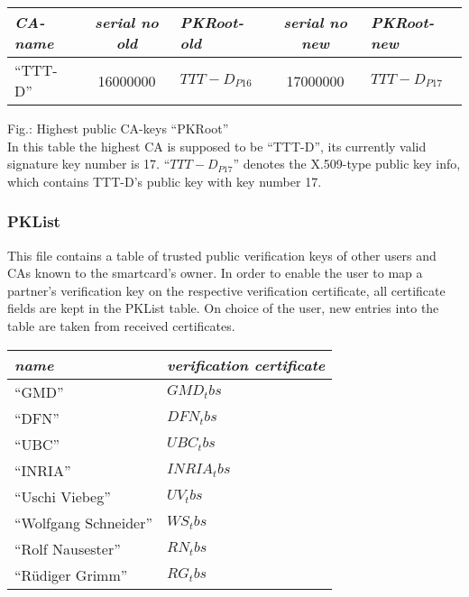 \begin {center}
\begin {tabular}{|l|c|l|c|l|}
\hline
{\em CA-name} &
{\em serial no old} & {\em PKRoot-old} &
{\em serial no new} & {\em PKRoot-new} \\
\hline
``TTT-D'' &
16000000 & $TTT-D_{P16}$ &
17000000 & $TTT-D_{P17}$ \\ \hline
\end {tabular}
\end {center}
 
\label{fig-pkroot}
{\footnotesize Fig.: Highest public CA-keys ``PKRoot''}
\\
{\footnotesize
In this table the highest CA is supposed to be
``TTT-D'', its currently valid signature key number is 17.
``$TTT-D_{P17}$'' denotes the X.509-type public key info,
which contains TTT-D's public key with key number 17.}

\subsubsection{PKList}
\label{pklist}

This file contains a table of trusted public verification keys of other
users and CAs known to the smartcard's owner.
In order to enable the user to map a partner's verification key
on the respective verification certificate,
all certificate fields are kept in the PKList table.
On choice of the user,
new entries into the table are taken from received certificates.

\begin {center}
\begin {tabular}{|l|l|}
\hline
{\em name} & {\em verification certificate}  \\ \hline
``GMD''                & $GMD_tbs$     \\ \hline
``DFN''                & $DFN_tbs$     \\ \hline
``UBC''                & $UBC_tbs$     \\ \hline
``INRIA''              & $INRIA_tbs$   \\ \hline
``Uschi Viebeg''       & $UV_tbs$      \\ \hline
``Wolfgang Schneider'' & $WS_tbs$      \\ \hline
``Rolf Nausester''     & $RN_tbs$      \\ \hline
``R\"udiger Grimm''    & $RG_tbs$      \\ \hline
\end {tabular}
\end {center}
 
